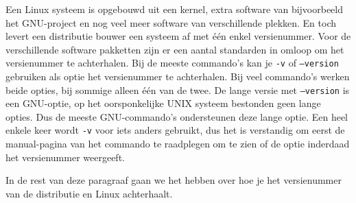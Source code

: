 Een Linux systeem is opgebouwd uit een kernel, extra software van bijvoorbeeld het GNU-project en nog veel meer software van verschillende plekken. En toch levert een distributie bouwer een systeem af met \'e\'en enkel versienummer. Voor de verschillende software pakketten zijn er een aantal standarden in omloop om het versienummer te achterhalen. Bij de meeste commando's kan je \texttt{-v} of \texttt{--version} gebruiken als optie het versienummer te achterhalen. Bij veel commando's werken beide opties, bij sommige alleen \'e\'en van de twee. De lange versie met \texttt{--version} is een GNU-optie, op het oorsponkelijke UNIX systeem bestonden geen lange opties. Dus de meeste GNU-commando's ondersteunen deze lange optie. Een heel enkele keer wordt \texttt{-v} voor iets anders gebruikt, dus het is verstandig om eerst de manual-pagina van het commando te raadplegen om te zien of de optie inderdaad het versienummer weergeeft.

In de rest van deze paragraaf gaan we het hebben over hoe je het versienummer van de distributie en Linux achterhaalt.
